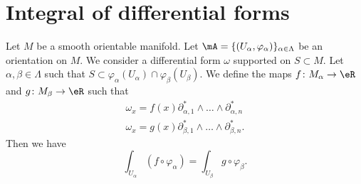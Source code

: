\section{Integral of differential forms}

\begin{proposition}	\label{PROPooGVQDooNwnGXs}
	Let \( M\) be a smooth orientable manifold. Let \( \mA= \{ (U_{\alpha},\varphi_{\alpha}) \}_{\alpha\in \Lambda}\) be an orientation on \( M\). We consider a differential form \( \omega\) supported on \( S\subset M\). Let \( \alpha,\beta\in\Lambda\) such that \( S\subset\varphi_{\alpha}(U_{\alpha})\cap\varphi_{\beta}(U_{\beta})\). We define the maps \(f \colon M_{\alpha}\to \eR  \) and \(g \colon M_{\beta}\to \eR  \) such that
	\begin{subequations}
		\begin{align}
			\omega_x=f(x)\partial_{\alpha,1}^*\wedge\ldots\wedge\partial_{\alpha,n}^* \\
			\omega_x=g(x)\partial_{\beta,1}^*\wedge\ldots\wedge\partial_{\beta,n}^*.
		\end{align}
	\end{subequations}
	Then we have
	\begin{equation}
		\int_{U_{\alpha}}(f\circ \varphi_{\alpha})=\int_{U_{\beta}}g\circ\varphi_{\beta}.
	\end{equation}
\end{proposition}

